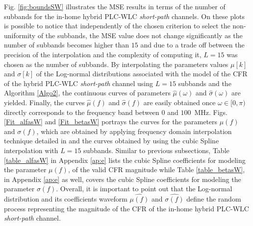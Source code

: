 Fig. \ref{fig:boundsSW} illustrates the \ac{MSE} results in terms of the number of subbands for the in-home hybrid \ac{PLC}-\ac{WLC} \textit{short-path} channels. On these plots is possible to notice that independently of the chosen criterion to select the non-uniformity of the subbands, the \ac{MSE} value does not change significantly as the number of subbands becomes higher than $15$ and  due to a trade off between the precision of the interpolation and the complexity of computing it, $L=15$ was chosen as the number of subbands. By interpolating the parameters values $\mu[k]$ and $\sigma[k]$ of the Log-normal distributions associated with the model of the \ac{CFR} of the hybrid \ac{PLC}-\ac{WLC} \textit{short-path} channel using $L=15$ subbands and the Algorithm \ref{Algo2}, the continuous curves of parameters $\hat{\mu}(\omega)$ and $\hat{\sigma}(\omega)$ are yielded. Finally, the curves $\hat{\mu}(f)$ and $\hat{\sigma}(f)$ are easily obtained once $\omega \in [0,\pi)$ directly corresponds to the frequency band between $0$ and $100$~MHz. Figs. \ref{Fit_alfasW} and \ref{Fit_betasW} portrays the curves for the parameters $\mu(f)$ and $\sigma(f)$, which are obtained by applying frequency domain interpolation technique detailed in \cite{mitra} and the curves obtained by using the cubic Spline interpolation with $L=15$ subbands. Similar to previous subsections, Table \ref{table_alfasW} in Appendix \ref{ap:e} lists the cubic Spline coefficients for modeling the parameter $\mu(f)$, of the valid \ac{CFR} magnitude while Table \ref{table_betasW}, in Appendix \ref{ap:e} as well, covers the cubic Spline coefficients for modeling the parameter $\sigma(f)$. Overall, it is important to point out that the Log-normal distribution and its coefficients waveform $\hat{\mu(f)}$ and $\hat{\sigma(f)}$ define the random process representing the magnitude of the \ac{CFR} of the in-home hybrid \ac{PLC}-\ac{WLC} \textit{short-path} channel.

